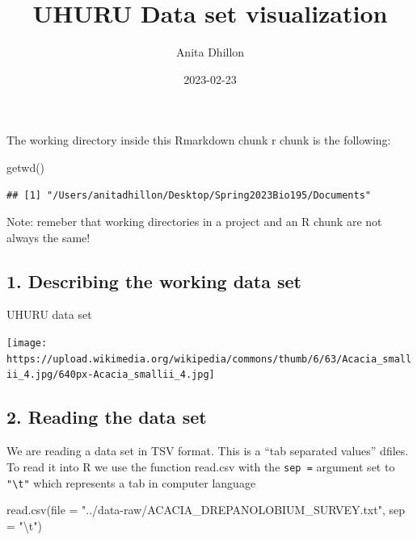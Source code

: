 \documentclass[
]{article}
\title{UHURU Data set visualization}
\author{Anita Dhillon}
\date{2023-02-23}
\newenvironment{Shaded}{\begin{snugshade}}{\end{snugshade}}
\newcommand{\AttributeTok}[1]{\textcolor[rgb]{0.77,0.63,0.00}{#1}}
\newcommand{\FunctionTok}[1]{\textcolor[rgb]{0.00,0.00,0.00}{#1}}
\newcommand{\NormalTok}[1]{#1}
\newcommand{\SpecialCharTok}[1]{\textcolor[rgb]{0.00,0.00,0.00}{#1}}
\newcommand{\StringTok}[1]{\textcolor[rgb]{0.31,0.60,0.02}{#1}}
\begin{document}
\maketitle

The working directory inside this Rmarkdown chunk r chunk is the
following:

\begin{Shaded}
\begin{Highlighting}[]
\FunctionTok{getwd}\NormalTok{()}
\end{Highlighting}
\end{Shaded}

\begin{verbatim}
## [1] "/Users/anitadhillon/Desktop/Spring2023Bio195/Documents"
\end{verbatim}

Note: remeber that working directories in a project and an R chunk are
not always the same!

\hypertarget{describing-the-working-data-set}{%
\subsection{1. Describing the working data
set}\label{describing-the-working-data-set}}

UHURU data set

\texttt{[image: https://upload.wikimedia.org/wikipedia/commons/thumb/6/63/Acacia\_smallii\_4.jpg/640px-Acacia\_smallii\_4.jpg]}

\hypertarget{reading-the-data-set}{%
\subsection{2. Reading the data set}\label{reading-the-data-set}}

We are reading a data set in TSV format. This is a ``tab separated
values'' dfiles. To read it into R we use the function read.csv with the
\texttt{sep\ =} argument set to \texttt{"\textbackslash{}t"} which
represents a tab in computer language

\begin{Shaded}
\begin{Highlighting}[]
 \FunctionTok{read.csv}\NormalTok{(}\AttributeTok{file =} \StringTok{"../data{-}raw/ACACIA\_DREPANOLOBIUM\_SURVEY.txt"}\NormalTok{, }\AttributeTok{sep =} \StringTok{"}\SpecialCharTok{\textbackslash{}t}\StringTok{"}\NormalTok{)}
\end{Highlighting}
\end{Shaded}
\end{document}
